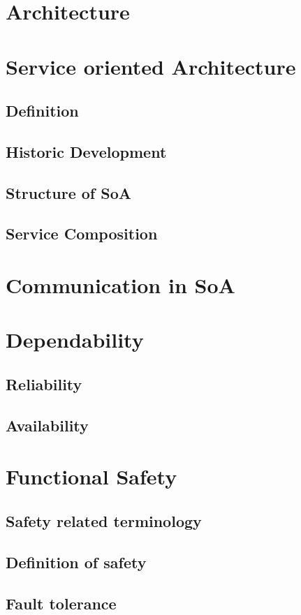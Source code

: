 \section{Architecture}

\section{Service oriented Architecture}
\subsection{Definition}
\subsection{Historic Development}
\subsection{Structure of SoA}
\subsection{Service Composition}

\section{Communication in SoA}

\section{Dependability}
\subsection{Reliability}
\subsection{Availability}

\section{Functional Safety}
\subsection{Safety related terminology}
\subsection{Definition of safety}
\subsection{Fault tolerance}